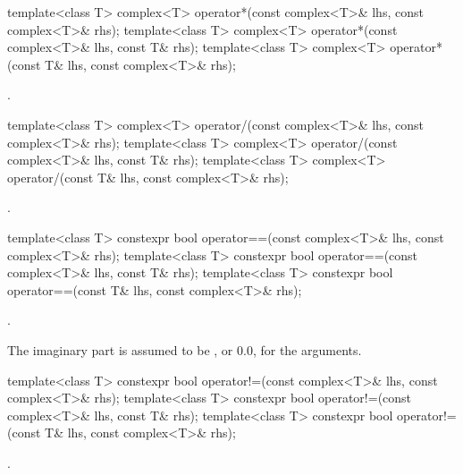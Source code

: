%
\begin{itemdecl}
template<class T> complex<T> operator*(const complex<T>& lhs, const complex<T>& rhs);
template<class T> complex<T> operator*(const complex<T>& lhs, const T& rhs);
template<class T> complex<T> operator*(const T& lhs, const complex<T>& rhs);
\end{itemdecl}

\begin{itemdescr}
\pnum
\returns
{}.
\end{itemdescr}

%
\begin{itemdecl}
template<class T> complex<T> operator/(const complex<T>& lhs, const complex<T>& rhs);
template<class T> complex<T> operator/(const complex<T>& lhs, const T& rhs);
template<class T> complex<T> operator/(const T& lhs, const complex<T>& rhs);
\end{itemdecl}

\begin{itemdescr}
\pnum
\returns
{}.
\end{itemdescr}

%
\begin{itemdecl}
template<class T> constexpr bool operator==(const complex<T>& lhs, const complex<T>& rhs);
template<class T> constexpr bool operator==(const complex<T>& lhs, const T& rhs);
template<class T> constexpr bool operator==(const T& lhs, const complex<T>& rhs);
\end{itemdecl}

\begin{itemdescr}
\pnum
\returns
{}.

\pnum
\remarks
The imaginary part is assumed to be
,
or 0.0, for the
arguments.
\end{itemdescr}

%
\begin{itemdecl}
template<class T> constexpr bool operator!=(const complex<T>& lhs, const complex<T>& rhs);
template<class T> constexpr bool operator!=(const complex<T>& lhs, const T& rhs);
template<class T> constexpr bool operator!=(const T& lhs, const complex<T>& rhs);
\end{itemdecl}

\begin{itemdescr}
\pnum
\returns
{}.
\end{itemdescr}

